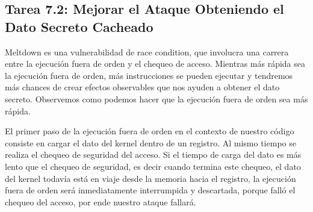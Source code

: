 %
%
%
%
%
%
%




\subsection{Tarea 7.2: Mejorar el Ataque Obteniendo el Dato Secreto Cacheado}

Meltdown es una vulnerabilidad de race condition, que involucra una carrera entre la ejecución fuera de orden y el chequeo de acceso. Mientras más rápida sea la ejecución fuera de orden, más instrucciones se pueden ejecutar y tendremos más chances de crear efectos observables que nos ayuden a obtener el dato secreto. Observemos como podemos hacer que la ejecución fuera de orden sea más rápida.

El primer paso de la ejecución fuera de orden en el contexto de nuestro código consiste en cargar el dato del kernel dentro de un registro. Al mismo tiempo se realiza el chequeo de seguridad del acceso.
Si el tiempo de carga del dato es más lento que el chequeo de seguridad, es decir cuando termina este chequeo, el dato del kernel todavía está en viaje desde la memoria hacia el registro, la ejecución fuera de orden será inmediatamente interrumpida y descartada, porque falló el chequeo del acceso, por ende nuestro ataque fallará.

